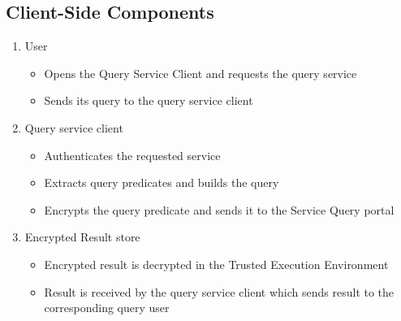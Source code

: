\subsection{Client-Side Components}
\begin{enumerate}
    \item User
          \begin{itemize}
              \item Opens the Query Service Client and requests the query service
              \item Sends its query to the query service client
          \end{itemize}
    \item Query service client
          \begin{itemize}
              \item Authenticates the requested service
              \item Extracts query predicates and builds the query
              \item Encrypts the query predicate and sends it to the Service Query portal
          \end{itemize}
    \item Encrypted Result store
          \begin{itemize}
              \item Encrypted result is decrypted in the Trusted Execution Environment
              \item Result is received by the query service client which sends result to the corresponding query user
          \end{itemize}
\end{enumerate}

